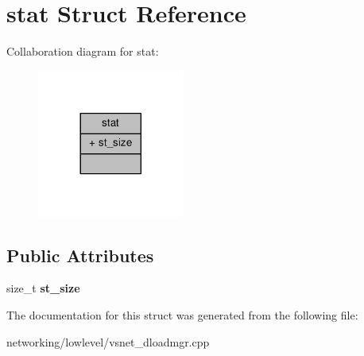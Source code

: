 \hypertarget{structstat}{}\section{stat Struct Reference}
\label{structstat}


Collaboration diagram for stat\+:
\nopagebreak
\begin{figure}[H]
\begin{center}
\leavevmode
\includegraphics[width=137pt]{dd/d74/structstat__coll__graph}
\end{center}
\end{figure}
\subsection*{Public Attributes}
\begin{DoxyCompactItemize}
\item 
size\+\_\+t {\bfseries st\+\_\+size}\hypertarget{structstat_a560f8d3d136586e0166e71378be3a23e}{}\label{structstat_a560f8d3d136586e0166e71378be3a23e}

\end{DoxyCompactItemize}


The documentation for this struct was generated from the following file\+:\begin{DoxyCompactItemize}
\item 
networking/lowlevel/vsnet\+\_\+dloadmgr.\+cpp\end{DoxyCompactItemize}
